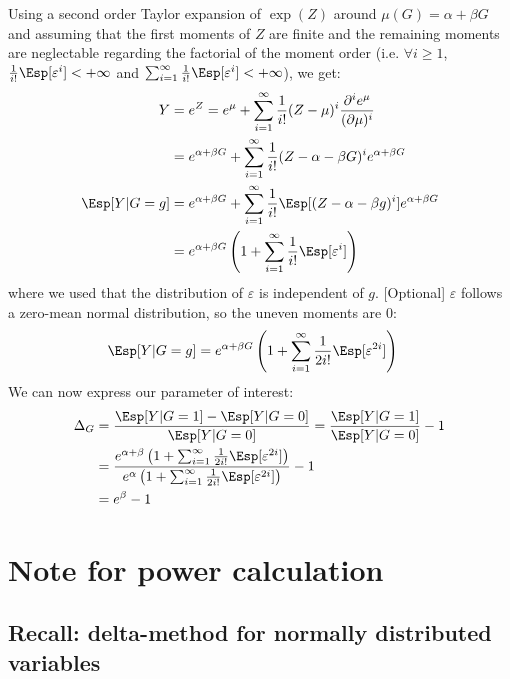 \documentclass[12pt]{article}
\begin{document}
Using a second order Taylor expansion of \(\exp(Z)\) around
\(\mu(G)=\alpha + \beta G\) and assuming that the first moments of
\(Z\) are finite and the remaining moments are neglectable regarding
the factorial of the moment order (i.e. \(\forall i \geq 1\),
\(\frac{1}{i!}\Esp[\varepsilon^i ]< +\infty\) and \(\sum_{i=1}^{\infty} \frac{1}{i!}\Esp[\varepsilon^i ]< +\infty\)), we get:
\begin{align*}
Y &= e^{Z} = e^{\mu} + \sum_{i=1}^{\infty} \frac{1}{i!} (Z - \mu)^i \frac{\partial^i e^{\mu}}{(\partial \mu)^i} \\
&= e^{\alpha + \beta G} + \sum_{i=1}^{\infty} \frac{1}{i!} (Z - \alpha - \beta G)^i e^{\alpha + \beta G} \\
\Esp[Y|G=g] &= e^{\alpha + \beta G} + \sum_{i=1}^{\infty} \frac{1}{i!} \Esp[(Z - \alpha - \beta g)^i] e^{\alpha + \beta G} \\
&= e^{\alpha + \beta G} \left(1 + \sum_{i=1}^{\infty} \frac{1}{i!} \Esp[\varepsilon^i] \right)
\end{align*}
where we used that the distribution of \(\varepsilon\) is independent
of \(g\). [Optional] \(\varepsilon\) follows a zero-mean normal distribution, so
the uneven moments are 0:
\begin{align*}
\Esp[Y|G=g] &= e^{\alpha + \beta G} \left(1 + \sum_{i=1}^{\infty} \frac{1}{2i!} \Esp[\varepsilon^{2i}] \right)
\end{align*}
We can now express our parameter of interest:
\begin{align*}
\Delta_G &= \frac{\Esp[Y|G=1]-\Esp[Y|G=0]}{\Esp[Y|G=0]} = \frac{\Esp[Y|G=1]}{\Esp[Y|G=0]} - 1 \\
&= \frac{e^{\alpha + \beta} \left(1 + \sum_{i=1}^{\infty} \frac{1}{2i!} \Esp[\varepsilon^{2i}] \right)}{e^{\alpha} \left(1 + \sum_{i=1}^{\infty} \frac{1}{2i!} \Esp[\varepsilon^{2i}] \right)} - 1 \\
&= e^{\beta} - 1
\end{align*}


\clearpage

\section{Note for power calculation}
\label{sec:orgd6c9c5c}

\subsection{Recall: delta-method for normally distributed variables}
\label{sec:org2be0bf6}
\end{document}
